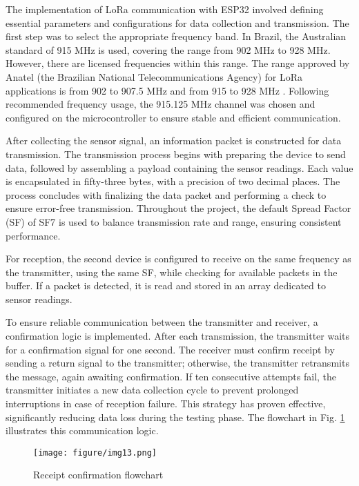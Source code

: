 \documentclass{ieeeaccess}
\begin{document}
The implementation of LoRa communication with ESP32 involved defining essential parameters and configurations for data collection and transmission. The first step was to select the appropriate frequency band. In Brazil, the Australian standard of 915 MHz is used, covering the range from 902 MHz to 928 MHz. However, there are licensed frequencies within this range. The range approved by Anatel (the Brazilian National Telecommunications Agency) for LoRa applications is from 902 to 907.5 MHz and from 915 to 928 MHz  \cite{pastorio20212}. Following  recommended frequency usage, the 915.125 MHz channel was chosen and configured on the microcontroller to ensure stable and efficient communication.


After collecting the sensor signal, an information packet is constructed for data transmission. The transmission process begins with preparing the device to send data, followed by assembling a payload containing the sensor readings. Each value is encapsulated in fifty-three bytes, with a precision of two decimal places. The process concludes with finalizing the data packet and performing a check to ensure error-free transmission. Throughout the project, the default Spread Factor (SF) of SF7 is used to balance transmission rate and range, ensuring consistent performance.

For reception, the second device is configured to receive on the same frequency as the transmitter, using the same SF, while checking for available packets in the buffer. If a packet is detected, it is read and stored in an array dedicated to sensor readings.

To ensure reliable communication between the transmitter and receiver, a confirmation logic is implemented. After each transmission, the transmitter waits for a confirmation signal for one second. The receiver must confirm receipt by sending a return signal to the transmitter; otherwise, the transmitter retransmits the message, again awaiting confirmation. If ten consecutive attempts fail, the transmitter initiates a new data collection cycle to prevent prolonged interruptions in case of reception failure. This strategy has proven effective, significantly reducing data loss during the testing phase. The flowchart in Fig. \ref{fig:fluxograma} illustrates this communication logic.



\begin{figure}[h]
    \centering
    \texttt{[image: figure/img13.png]}
    \caption{Receipt confirmation flowchart}
    \label{fig:fluxograma}
\end{figure}
\end{document}
